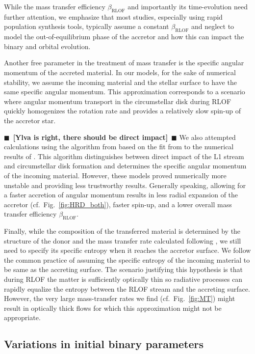 \documentclass[twocolumn,twocolappendix,trackchanges]{aastex63}
\DeclareRobustCommand{\Figref}[1]{Fig.~\ref{#1}}
\newcommand{\todo}[1]{{\large $\blacksquare$~\textbf{\color{red}[#1]}}~$\blacksquare$}
\begin{document}
While the mass transfer efficiency $\beta_\mathrm{RLOF}$ and
importantly its time-evolution need further attention, we emphasize that most studies, especially
using rapid population synthesis tools, typically assume a
constant $\beta_\mathrm{RLOF}$ and neglect to model the
out-of-equilibrium phase of the accretor and how this can impact the
binary and orbital evolution.

Another free parameter in the treatment of mass transfer is the
specific angular momentum of the accreted material. In our models, for
the sake of numerical stability, we assume the incoming material and
the stellar surface to have the same specific angular momentum. This
approximation corresponds to a scenario where angular momentum
transport in the circumstellar disk during RLOF quickly homogenizes
the rotation rate and provides a relatively slow spin-up of the
accretor star.

\todo{Ylva is right, there should be direct impact}
We also attempted calculations using the algorithm from
\cite{demink:13} based on the fit from \cite{ulrich:76} to the
numerical results of \cite{lubow:75}. This algorithm distinguishes between
direct impact of the L1 stream and circumstellar disk
formation and determines the specific angular momentum of the incoming
material. However, these models proved numerically more unstable and
providing less trustworthy results. Generally speaking, allowing for a
faster accretion of angular momentum results in less radial expansion
of the accretor (cf.~\Figref{fig:HRD_both}), faster spin-up, and a lower overall mass
transfer efficiency $\beta_\mathrm{RLOF}$.

Finally, while the composition of the transferred material is
determined by the structure of the donor and the mass transfer rate
calculated following \cite{kolb:90}, we still need to specify its
specific entropy when it reaches the accretor surface. We follow the
common practice of assuming the specific entropy of the incoming
material to be same as the accreting surface. The scenario justifying
this hypothesis is that during RLOF the matter is
sufficiently optically thin so radiative processes can rapidly
equalize the entropy between the RLOF stream and the accreting
surface. However, the very large mass-transfer rates we find
(cf.~\Figref{fig:MT}) might result in optically thick flows for which
this approximation might not be appropriate.

\subsection{Variations in initial binary parameters}
\label{sec:bin_init}
\end{document}
